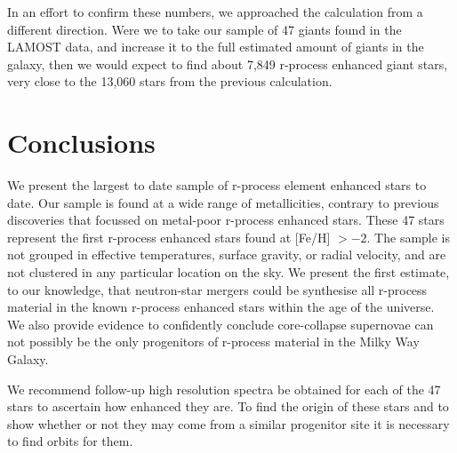 \documentclass[a4paper,fleqn,usenatbib]{mnras}
\begin{document}
    In an effort to confirm these numbers, we approached the calculation from a different direction. Were we to take our sample of 47 giants found in the LAMOST data, and increase it to the full estimated amount of giants in the galaxy, then we would expect to find about 7,849 r-process enhanced giant stars, very close to the 13,060 stars from the previous calculation.
	
	\section{Conclusions}
	We present the largest to date sample of r-process element enhanced stars to date. Our sample is found at a wide range of metallicities, contrary to previous discoveries that focussed on metal-poor r-process enhanced stars. These 47 stars represent the first r-process enhanced stars found at [Fe/H] $>-2$. The sample is not grouped in effective temperatures, surface gravity, or radial velocity, and are not clustered in any  particular location on the sky. We present the first estimate, to our knowledge, that neutron-star mergers could be synthesise all r-process material in the known r-process enhanced stars within the age of the universe. We also provide evidence to confidently conclude core-collapse supernovae can not possibly be the only progenitors of r-process material in the Milky Way Galaxy.
	
	We recommend follow-up high resolution spectra be obtained for each of the 47 stars to ascertain how enhanced they are. To find the origin of these stars and to show whether or not they may come from a similar progenitor site it is necessary to find orbits for them.
	
	
	
\end{document}
